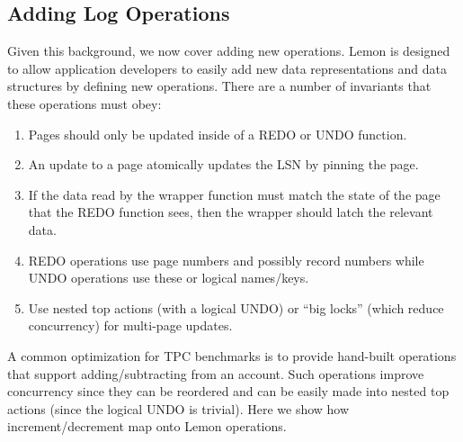 \documentclass[10pt,letterpaper,twocolumn,english]{article}
\newcommand{\yad}{Lemon\xspace}
\begin{document}
\subsection{Adding Log Operations}
\label{op-def}


Given this background, we now cover adding new operations. \yad is
designed to allow application developers to easily add new data
representations and data structures by defining new operations.
There are a number of invariants that these operations must obey:
\begin{enumerate}
\item Pages should only be updated inside of a REDO or UNDO function.
\item An update to a page atomically updates the LSN by pinning the page.
\item If the data read by the wrapper function must match the state of
the page that the REDO function sees, then the wrapper should latch
the relevant data.
\item REDO operations use page numbers and possibly record numbers
while UNDO operations use these or logical names/keys.
\item Use nested top actions (with a logical UNDO) 
or ``big locks'' (which reduce concurrency) for multi-page updates.
\end{enumerate}


A common optimization for TPC benchmarks is to provide hand-built
operations that support adding/subtracting from an account.  Such
operations improve concurrency since they can be reordered and can be
easily made into nested top actions (since the logical UNDO is
trivial). Here we show how increment/decrement map onto \yad operations.
\end{document}
